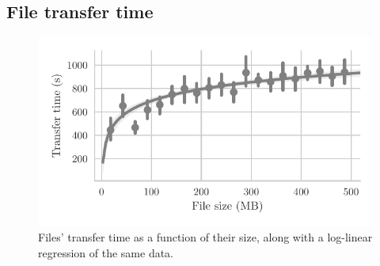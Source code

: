 \subsection{File transfer time} %
\label{sub:file_transfer}

\begin{figure}[t]
\centering
\includegraphics[width=0.9\columnwidth]{figures/transfer_time_vs_size.pdf}

\caption{\label{fig:transfer_time_vs_size}Files' transfer time as a function of their size, along with a log-linear regression of the same data.}
\end{figure}


